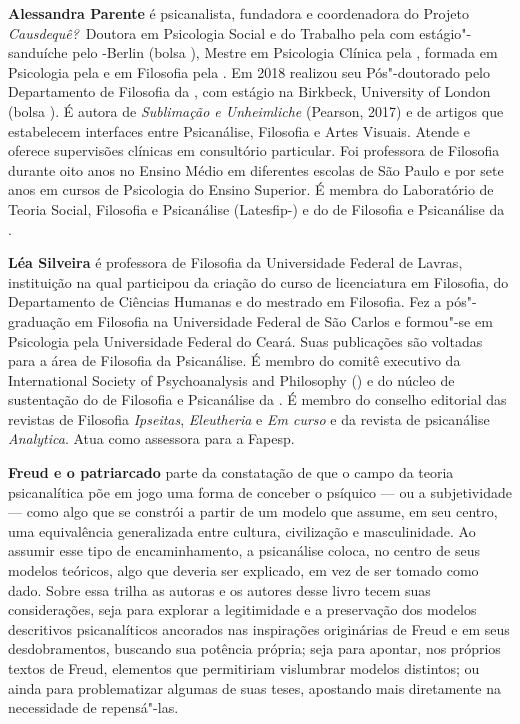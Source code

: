 \textbf{Alessandra Parente} é psicanalista, fundadora e coordenadora do
Projeto \emph{Causdequê?} Doutora em Psicologia Social e do Trabalho pela  com
estágio"-sanduíche pelo -Berlin (bolsa ), Mestre em Psicologia Clínica pela
, formada em Psicologia pela  e em Filosofia pela . Em 2018 realizou seu Pós"-doutorado pelo Departamento de Filosofia da , com estágio na
Birkbeck, University of London (bolsa ). É autora de
\emph{Sublimação e Unheimliche} (Pearson, 2017) e de artigos que estabelecem interfaces entre
Psicanálise, Filosofia e Artes Visuais. Atende e oferece supervisões clínicas em
consultório particular. Foi professora de Filosofia durante oito anos no Ensino Médio
em diferentes escolas de São Paulo e por sete anos em cursos de Psicologia do Ensino
Superior. É membra do Laboratório de Teoria Social, Filosofia e Psicanálise (Latesfip-) e do  de Filosofia e Psicanálise da .

\textbf{Léa Silveira} é professora de Filosofia da Universidade Federal de Lavras, instituição na
qual participou da criação do curso de licenciatura em Filosofia, do Departamento de
Ciências Humanas e do mestrado em Filosofia. Fez a pós"-graduação em Filosofia na
Universidade Federal de São Carlos e formou"-se em Psicologia pela Universidade
Federal do Ceará. Suas publicações são voltadas para a área de Filosofia da Psicanálise.
É membro do comitê executivo da International Society of Psychoanalysis and
Philosophy () e do núcleo de sustentação do  de Filosofia e Psicanálise da . É membro do conselho editorial das revistas de Filosofia \emph{Ipseitas}, \emph{Eleutheria} e \emph{Em curso} e da revista de psicanálise \emph{Analytica}. Atua como assessora para a Fapesp.

\textbf{Freud e o patriarcado} parte da constatação de que o campo da teoria psicanalítica põe em jogo uma forma de conceber o psíquico --- ou a subjetividade --- como algo que se constrói a partir de um modelo que assume, em seu centro, uma equivalência generalizada entre cultura, civilização e masculinidade. Ao assumir esse tipo de encaminhamento, a psicanálise coloca, no centro de seus modelos teóricos, algo que deveria ser explicado, em vez de ser tomado como dado. Sobre essa trilha as autoras e os autores desse livro tecem suas considerações, seja para explorar a legitimidade e a preservação dos modelos descritivos psicanalíticos ancorados nas inspirações originárias de Freud e em seus desdobramentos, buscando sua potência própria; seja para apontar, nos próprios textos de Freud, elementos que permitiriam vislumbrar modelos distintos; ou ainda para problematizar algumas de suas teses, apostando mais diretamente na necessidade de repensá"-las. 







